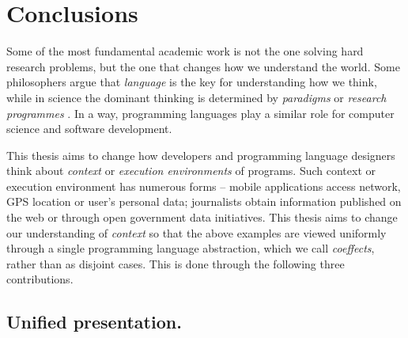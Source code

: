 
\chapter{Conclusions} 
\label{ch:conclusions} 

%

Some of the most fundamental academic work is not the one solving hard research problems, but the 
one that changes how we understand the world. Some philosophers argue that \emph{language} is the 
key for understanding how we think, while in science the dominant thinking is determined by 
\emph{paradigms} \cite{philosophy-kuhn} or \emph{research programmes} \cite{philosophy-lakatos}.
In a way, programming languages play a similar role for computer science and software development.

This thesis aims to change how developers and programming language designers think about 
\emph{context} or \emph{execution environments} of programs. Such context or execution environment
has numerous forms -- mobile applications access network, GPS location or user's personal data; 
journalists obtain information published on the web or through open government data initiatives. 
This thesis aims to change our understanding of \emph{context} so that the above examples are 
viewed uniformly through a single programming language abstraction, which we call \emph{coeffects}, 
rather than as disjoint cases. This is done through the following three contributions.


\section{Unified presentation.}

